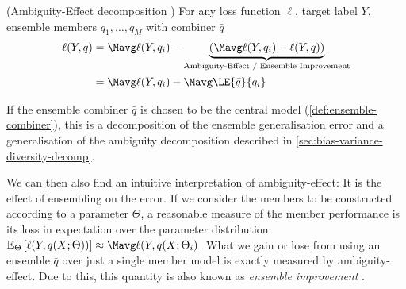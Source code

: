 \documentclass[../main.tex]{subfiles}
\begin{document}
\begin{theorem} \label{thm:ambig-effect-decomp} (Ambiguity-Effect decomposition \cite{wood_UnifiedTheoryDiversity_2023}) For any loss function $\ell$, target label $Y$, ensemble members $q_{1}, \dots, q_{M}$ with combiner $\bar{q}$
\begin{align*}
\ell(Y, \bar{q}) &= \Mavg \ell(Y, q_{i}) -
\underbrace{\left(\Mavg \ell(Y, q_{i}) - \ell(Y, \bar{q})\right)}_{\text{Ambiguity-Effect / Ensemble Improvement}} \\
&= \Mavg \ell(Y, q_i) - \Mavg \LE{\bar{q}}{q_i}
\end{align*}
\end{theorem}
If the ensemble combiner $\bar{q}$ is chosen to be the central model (\cf \ref{def:ensemble-combiner}), this is a decomposition of the ensemble generalisation error and a generalisation of the ambiguity decomposition described in \cref{sec:bias-variance-diversity-decomp}.

We can then also find an intuitive interpretation of ambiguity-effect: It is the effect of ensembling on the error. If we consider the members to be constructed according to a parameter $\Theta$, a reasonable measure of the member performance is its loss in expectation over the parameter distribution: $\mathbb{E}_{\Theta}\left[ \ell(Y, q(X; \Theta))  \right] \approx \Mavg \ell(Y, q(X;\Theta_{i})$. What we gain or lose from using an ensemble $\bar{q}$ over just a single member model is exactly measured by ambiguity-effect. Due to this, this quantity is also known as \textit{ensemble improvement} \cite{theisen_WhenAreEnsembles_2023,abe_BestDeepEnsembles_2022}.



\end{document}
